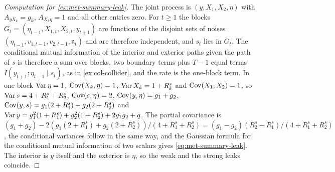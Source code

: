 \begin{proof}[Computation for \cref{ex:met-summary-leak}]
The joint process is $(y,X_1,X_2,\eta)$ with $A_{yX_k}=g_k$, $A_{X_k\eta}=1$ and all other entries zero. For $t\ge1$ the blocks $G_t=(\eta_{t-1},X_{1,t},X_{2,t},y_{t+1})$ are functions of the disjoint sets of noises $(\eta_{t-1},v_{1,t-1},v_{2,t-1},\mathfrak n_t)$ and are therefore independent, and $s_t$ lies in $G_t$. The conditional mutual information of the interior and exterior paths given the path of $s$ is therefore a sum over blocks, two boundary terms plus $T-1$ equal terms $I(y_{t+1};\eta_{t-1}\mid s_t)$, as in \cref{ex:col-collider}, and the rate is the one-block term. In one block $\operatorname{Var}\eta=1$, $\operatorname{Cov}(X_k,\eta)=1$, $\operatorname{Var} X_k=1+R^s_k$ and $\operatorname{Cov}(X_1,X_2)=1$, so $\operatorname{Var} s=4+R^s_1+R^s_2$, $\operatorname{Cov}(s,\eta)=2$, $\operatorname{Cov}(y,\eta)=g_1+g_2$, $\operatorname{Cov}(y,s)=g_1(2+R^s_1)+g_2(2+R^s_2)$ and $\operatorname{Var} y=g_1^2(1+R^s_1)+g_2^2(1+R^s_2)+2g_1g_2+q$. The partial covariance is $(g_1+g_2)-2(g_1(2+R^s_1)+g_2(2+R^s_2))/(4+R^s_1+R^s_2)=(g_1-g_2)(R^s_2-R^s_1)/(4+R^s_1+R^s_2)$, the conditional variances follow in the same way, and the Gaussian formula for the conditional mutual information of two scalars gives \eqref{eq:met-summary-leak}. The interior is $y$ itself and the exterior is $\eta$, so the weak and the strong leaks coincide.
\end{proof}

